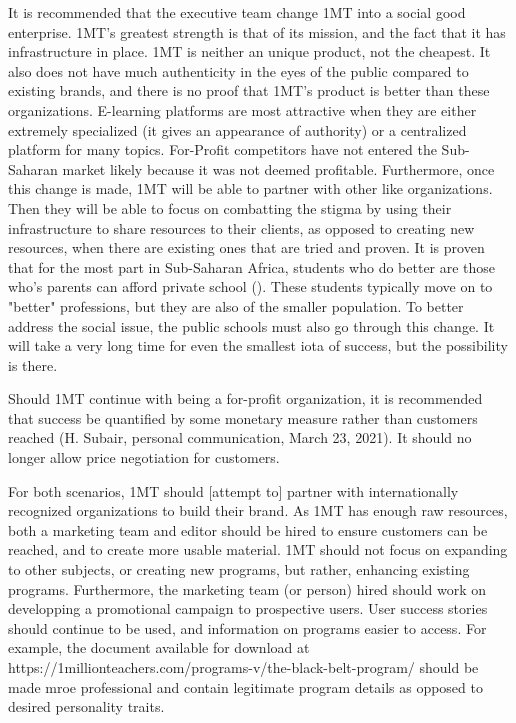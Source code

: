 \documentclass[letterpaper]{article}
\begin{document}
    It is recommended that the executive team change 1MT into a social good enterprise. 1MT's greatest strength is that of its mission, and the fact that it has infrastructure in place. 1MT is neither an unique product, not the cheapest. It also does not have much authenticity in the eyes of the public compared to existing brands, and there is no proof that 1MT's product is better than these organizations. E-learning platforms are most attractive when they are either extremely specialized (it gives an appearance of authority) or a centralized platform for many topics. For-Profit competitors have not entered the Sub-Saharan market likely because it was not deemed profitable. Furthermore, once this change is made, 1MT will be able to partner with other like organizations. Then they will be able to focus on combatting the stigma by using their infrastructure to share resources to their clients, as opposed to creating new resources, when there are existing ones that are tried and proven. It is proven that for the most part in Sub-Saharan Africa, students who do better are those who's parents can afford private school (\cite{private-public-success}). These students typically move on to "better" professions, but they are also of the smaller population. To better address the social issue, the public schools must also go through this change. It will take a very long time for even the smallest iota of success, but the possibility is there.

    Should 1MT continue with being a for-profit organization, it is recommended that success be quantified by some monetary measure rather than customers reached (H. Subair, personal communication, March 23, 2021). It should no longer allow price negotiation for customers. 
    
    For both scenarios, 1MT should [attempt to] partner with internationally recognized organizations to build their brand. As 1MT has enough raw resources, both a marketing team and editor should be hired to ensure customers can be reached, and to create more usable material. 1MT should not focus on expanding to other subjects, or creating new programs, but rather, enhancing existing programs. Furthermore, the marketing team (or person) hired should work on developping a promotional campaign to prospective users. User success stories should continue to be used, and information on programs easier to access. For example, the document available for download at https://1millionteachers.com/programs-v/the-black-belt-program/ should be made mroe professional and contain legitimate program details as opposed to desired personality traits.
\end{document}
